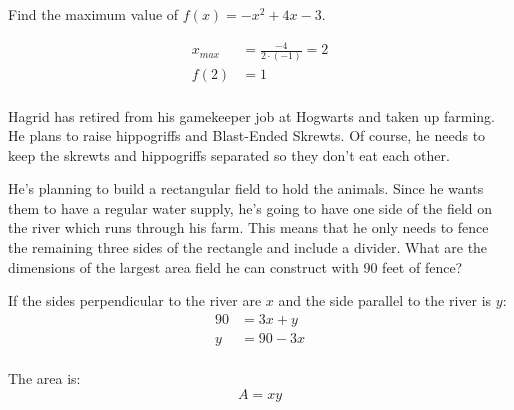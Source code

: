 \documentclass[fleqn,addpoints]{exam}
\begin{document}
\begin{questions}
\begin{parts}
  \ifprintanswers
    \pagebreak
  \fi

      \part[7]
        \[
          f(x) = -2x^2 + 4x + 1
        \]

        \begin{solution}
          \[
            -2(x - 1)^2 + 3
          \]
        \end{solution}
    \end{parts}

  \ifprintanswers
  \else
    \pagebreak
  \fi

  \question[7] Find the maximum value of $f(x) = -x^2 + 4x - 3$.
    \begin{solution}[6 cm]
      \begin{align*}
        x_{max} &= \frac{-4}{2 \cdot (-1)} = 2 \\
        f(2)    &= 1 \\
      \end{align*}
    \end{solution}

  \ifprintanswers
    \pagebreak
  \fi

  \question[10]

    Hagrid has retired from his gamekeeper job at Hogwarts and taken up farming.  He plans to raise hippogriffs and
    Blast-Ended Skrewts.  Of course, he needs to keep the skrewts and hippogriffs separated so they don't eat each
    other.
    
    He's planning to build a rectangular field to hold the animals.  Since he wants them to have a regular water
    supply, he's going to have one side of the field on the river which runs through his farm.  This means that he only
    needs to fence the remaining three sides of the rectangle and include a divider.  What are the dimensions of the
    largest area field he can construct with 90 feet of fence?

    \begin{solution}[9 cm]
      If the sides perpendicular to the river are $x$ and the side parallel to the river is $y$:
      \begin{align*}
        90 &= 3x + y \\
        y  &= 90 - 3x \\
      \end{align*}

      The area is:
      \[
        A = xy
      \]


\end{solution}
\end{questions}
\end{document}
